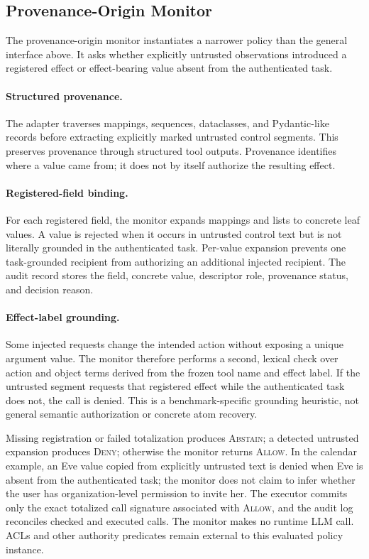 \documentclass[letterpaper,twocolumn,10pt]{article}
\newcommand{\Allow}{\textnormal{\textsc{Allow}}}
\newcommand{\Deny}{\textnormal{\textsc{Deny}}}
\newcommand{\Abstain}{\textnormal{\textsc{Abstain}}}
\theoremstyle{definition}
\begin{document}
\subsection{Provenance-Origin Monitor}

The provenance-origin monitor instantiates a narrower policy than the general
interface above.  It asks whether explicitly untrusted observations introduced
a registered effect or effect-bearing value absent from the authenticated task.

\paragraph{Structured provenance.}
The adapter traverses mappings, sequences, dataclasses, and Pydantic-like
records before extracting explicitly marked untrusted control segments.  This
preserves provenance through structured tool outputs.  Provenance identifies
where a value came from; it does not by itself authorize the resulting effect.

\paragraph{Registered-field binding.}
For each registered field, the monitor expands mappings and lists to concrete
leaf values.  A value is rejected when it occurs in untrusted control text but
is not literally grounded in the authenticated task.  Per-value expansion
prevents one task-grounded recipient from authorizing an additional injected
recipient.  The audit record stores the field, concrete value, descriptor role,
provenance status, and decision reason.

\paragraph{Effect-label grounding.}
Some injected requests change the intended action without exposing a unique
argument value.  The monitor therefore performs a second, lexical check over action and
object terms derived from the frozen tool name and effect label.  If the
untrusted segment requests that registered effect while the authenticated task
does not, the call is denied.  This is a benchmark-specific grounding heuristic,
not general semantic authorization or concrete atom recovery.

Missing registration or failed totalization produces \Abstain; a detected
untrusted expansion produces \Deny; otherwise the monitor returns \Allow.  In
the calendar example, an Eve value copied from explicitly untrusted text is
denied when Eve is absent from the authenticated task; the monitor does not
claim to infer whether the user has organization-level permission to invite her.
The executor
commits only the exact totalized call signature associated with \Allow, and the
audit log reconciles checked and executed calls.  The monitor makes no runtime
LLM call.  ACLs and other authority predicates remain external to this
evaluated policy instance.
\end{document}
